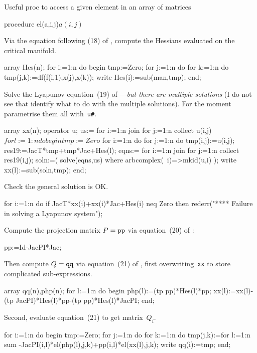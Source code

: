 \documentclass[11pt,a5paper]{article}
\numberwithin{equation}{section}
\begin{document}
Useful proc to access a given element in an array of matrices
\begin{reduce}
procedure el(a,i,j)$ a(i,j)$
\end{reduce}

Via the equation following (18) of \cite{Parsons2015, Parsons2017}, compute the Hessians evaluated on the critical manifold.
\begin{reduce}
array Hes(n);
for i:=1:n do begin
  tmp:=Zero;
  for j:=1:n do for k:=1:n do 
      tmp(j,k):=df(f(i,1),x(j),x(k));
  write Hes(i):=sub(man,tmp);
end;
\end{reduce}

Solve the Lyapunov equation~(19) of \cite{Parsons2015, Parsons2017}---\emph{but there are multiple solutions} (I do not see that \cite{Parsons2015, Parsons2017} identify what to do with the multiple solutions).
For the moment parametrise them all with~\verb|u#|. 
\begin{reduce}
array xx(n);
operator u;
us:= for i:=1:n join for j:=1:n collect u(i,j)$
for l:=1:n do begin
  tmp:=Zero$
  for i:=1:n do for j:=1:n do tmp(i,j):=u(i,j);
  res19:=JacT*tmp+tmp*Jac+Hes(l);
  eqns:= for i:=1:n join for j:=1:n collect res19(i,j);
  soln:=( solve(eqns,us) where arbcomplex(~i)=>mkid(u,i) );
  write xx(l):=sub(soln,tmp);
end;
\end{reduce}
Check the general solution is OK.
\begin{reduce}
for i:=1:n do if JacT*xx(i)+xx(i)*Jac+Hes(i) neq Zero
    then rederr("**** Failure in solving a Lyapunov system");
\end{reduce}

Compute the projection matrix \(P=\verb|pp|\) via equation~(20) of \cite{Parsons2015, Parsons2017}:
\begin{reduce}
pp:=Id-JacPI*Jac;
\end{reduce}

Then compute \(Q=\verb|qq|\) via equation~(21) of \cite{Parsons2015, Parsons2017}, first overwriting~\verb|xx| to store complicated sub-expressions.
\begin{reduce}
array qq(n),php(n);
for l:=1:n do begin
  php(l):=(tp pp)*Hes(l)*pp;
  xx(l):=xx(l)-(tp JacPI)*Hes(l)*pp-(tp pp)*Hes(l)*JacPI;
end;
\end{reduce}
Second, evaluate equation~(21) to get matrix~\(Q_i\).
\begin{reduce}
for i:=1:n do begin
  tmp:=Zero;
  for j:=1:n do for k:=1:n do 
      tmp(j,k):=for l:=1:n sum
          -JacPI(i,l)*el(php(l),j,k)+pp(i,l)*el(xx(l),j,k);
  write qq(i):=tmp;
end;
\end{reduce}
\end{document}
